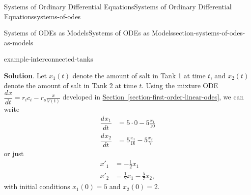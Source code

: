 \documentclass[oneside,10pt,]{book}
\numberwithin{equation}{section}
\newcommand{\dv}[3][]{\dfrac{d^{#1} #2}{d #3^{#1}}}
\newcommand{\amp}{&}
\begin{document}
\begin{chapterptx}{Systems of Ordinary Differential Equations}{}{Systems of Ordinary Differential Equations}{}{}{systems-of-odes}
\begin{sectionptx}{Systems of ODEs as Models}{}{Systems of ODEs as Models}{}{}{section-systems-of-odes-as-models}
\begin{example}{}{example-interconnected-tanks}
\par\smallskip%
\noindent\textbf{Solution}.\hypertarget{solution-46}{}\quad%
\hypertarget{p-302}{}%
Let \(x_{1}(t)\) denote the amount of salt in Tank 1 at time \(t\), and \(x_{2}(t)\) denote the amount of salt in Tank 2 at time \(t\). Using the mixture ODE \(\dv{x}{t} = r_{i}c_{i}-r_{o}\frac{x}{V(t)}\) developed in \hyperref[section-first-order-linear-odes]{Section~\ref{section-first-order-linear-odes}}, we can write%
\begin{align*}
\dv{x_{1}}{t} \amp= 5\cdot0 - 5\frac{x_{1}}{10}\\
\dv{x_{2}}{t} \amp= 5\frac{x_{1}}{10}-5\frac{x_{2}}{7}
\end{align*}
or just%
\begin{align*}
x'_{1}  \amp=  -\frac{1}{2}x_{1}\\
x'_{2}  \amp=  \frac{1}{2}x_{1}-\frac{5}{7}x_{2},
\end{align*}
with initial conditions \(x_{1}(0) = 5\) and \(x_{2}(0) = 2\).%
\end{example}
\begin{figure}
\centering
{
}
\end{figure}
\end{sectionptx}
\end{chapterptx}
\end{document}
